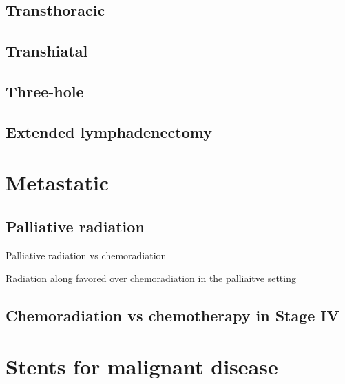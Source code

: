 \documentclass[
]{book}
\begin{document}
\hypertarget{transthoracic}{%
\section{Transthoracic}\label{transthoracic}}

\hypertarget{transhiatal}{%
\section{Transhiatal}\label{transhiatal}}

\hypertarget{three-hole}{%
\section{Three-hole}\label{three-hole}}

\hypertarget{extended-lymphadenectomy}{%
\section{Extended lymphadenectomy}\label{extended-lymphadenectomy}}

\hypertarget{eso_metastatic}{%
\chapter{Metastatic}\label{eso_metastatic}}

\hypertarget{palliative-radiation}{%
\section{Palliative radiation}\label{palliative-radiation}}

Palliative radiation vs chemoradiation \citep{penniment114}

Radiation along favored over chemoradiation in the palliaitve setting \citep{penniment114}

\hypertarget{chemoradiation-vs-chemotherapy-in-stage-iv}{%
\section{Chemoradiation vs chemotherapy in Stage IV}\label{chemoradiation-vs-chemotherapy-in-stage-iv}}

\citep{guttmann1131}

\hypertarget{stents-for-malignant-disease}{%
\chapter{Stents for malignant disease}\label{stents-for-malignant-disease}}
\end{document}

